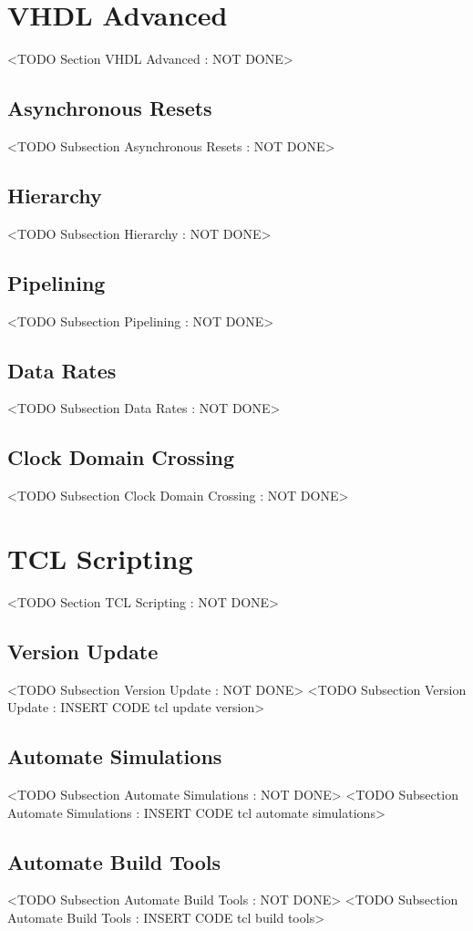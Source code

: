 \section{VHDL Advanced}
	<TODO Section VHDL Advanced : NOT DONE>
	
\subsection{Asynchronous Resets}
	<TODO Subsection Asynchronous Resets : NOT DONE>
		
\subsection{Hierarchy} 
	<TODO Subsection Hierarchy : NOT DONE>

\subsection{Pipelining}
	<TODO Subsection Pipelining : NOT DONE>

\subsection{Data Rates}
	<TODO Subsection Data Rates : NOT DONE>

\subsection{Clock Domain Crossing}
	<TODO Subsection Clock Domain Crossing : NOT DONE>
	
\section{TCL Scripting}
	<TODO Section TCL Scripting : NOT DONE>

\subsection{Version Update}
	<TODO Subsection Version Update : NOT DONE>
	<TODO Subsection Version Update : INSERT CODE tcl update version>

\subsection{Automate Simulations}
	<TODO Subsection Automate Simulations : NOT DONE>
	<TODO Subsection Automate Simulations : INSERT CODE tcl automate simulations>

\subsection{Automate Build Tools}
	<TODO Subsection Automate Build Tools : NOT DONE>
	<TODO Subsection Automate Build Tools : INSERT CODE tcl build tools>
